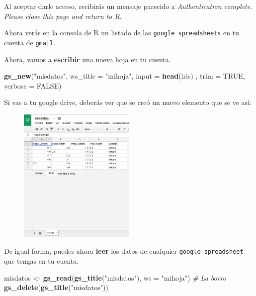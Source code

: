 \documentclass[]{article}
\newenvironment{Shaded}{\begin{snugshade}}{\end{snugshade}}
\newcommand{\KeywordTok}[1]{\textcolor[rgb]{0.13,0.29,0.53}{\textbf{#1}}}
\newcommand{\DataTypeTok}[1]{\textcolor[rgb]{0.13,0.29,0.53}{#1}}
\newcommand{\StringTok}[1]{\textcolor[rgb]{0.31,0.60,0.02}{#1}}
\newcommand{\CommentTok}[1]{\textcolor[rgb]{0.56,0.35,0.01}{\textit{#1}}}
\newcommand{\OtherTok}[1]{\textcolor[rgb]{0.56,0.35,0.01}{#1}}
\newcommand{\NormalTok}[1]{#1}
\begin{document}
Al aceptar darle acceso, recibirás un mensaje parecido a
\emph{Authentication complete. Please close this page and return to R.}

Ahora verás en la consola de R un listado de las
\texttt{google\ spreadsheets} en tu cuenta de \texttt{gmail}.

Ahora, vamos a \textbf{escribir} una nueva hoja en tu cuenta.

\begin{Shaded}
\begin{Highlighting}[]
\KeywordTok{gs_new}\NormalTok{(}\StringTok{"misdatos"}\NormalTok{, }\DataTypeTok{ws_title =} \StringTok{"mihoja"}\NormalTok{, }\DataTypeTok{input =} \KeywordTok{head}\NormalTok{(iris)}
\NormalTok{       , }\DataTypeTok{trim =} \OtherTok{TRUE}\NormalTok{, }\DataTypeTok{verbose =} \OtherTok{FALSE}\NormalTok{)}
\end{Highlighting}
\end{Shaded}

Si vas a tu google drive, deberás ver que se creó un nuevo elemento que
se ve así:

\begin{figure}[H]
\centering
\includegraphics[width=0.5\textwidth]{../img/gs_nuevo.png}
\end{figure}

De igual forma, puedes ahora \textbf{leer} los datos de cualquier
\texttt{google\ spreadsheet} que tengas en tu cuenta.

\begin{Shaded}
\begin{Highlighting}[]
\NormalTok{misdatos <-}\StringTok{ }\KeywordTok{gs_read}\NormalTok{(}\KeywordTok{gs_title}\NormalTok{(}\StringTok{"misdatos"}\NormalTok{), }\DataTypeTok{ws =} \StringTok{"mihoja"}\NormalTok{)}
\CommentTok{# La borro}
\KeywordTok{gs_delete}\NormalTok{(}\KeywordTok{gs_title}\NormalTok{(}\StringTok{"misdatos"}\NormalTok{))}
\end{Highlighting}
\end{Shaded}
\end{document}
